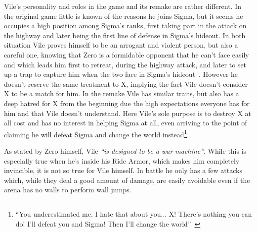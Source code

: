 Vile's personality and roles in the \x game and its remake are rather different. In the original game little is known of the reasons he joins Sigma, but it seems he occupies a high position among Sigma's ranks, first taking part in the attack on the highway and later being the first line of defense in Sigma's hideout. In both situation Vile proves himself to be an arrogant and violent person, but also a careful one, knowing that Zero is a formidable opponent that he can't face easily and which leads him first to retreat, during the highway attack, and later to set up a trap to capture him when the two face in Sigma's hideout~\cite{wiki:Vile}.  However he doesn't reserve the same treatment to X, implying the fact Vile doesn't consider X to be a match for him. In the remake Vile has similar traits, but also has a deep hatred for X from the beginning due the high expectations everyone has for him and that Vile doesn't understand. Here Vile's sole purpose is to destroy X at all cost and has no interest in helping Sigma at all, even arriving to the point of claiming he will defeat Sigma and change the world instead\footnote{\enquote{You underestimated me. I hate that about you... X! There's nothing you can do! I'll defeat you and Sigma! Then I'll change the world}~\cite{wiki:MMX_script}}.

As stated by Zero himself, Vile \emph{``is designed to be a war machine''}. While this is especially true when he's inside his Ride Armor, which makes him completely invincible, it is not so true for Vile himself. In battle he only has a few attacks which, while they deal a good amount of damage, are easily avoidable even if the arena has no walls to perform wall jumps.

